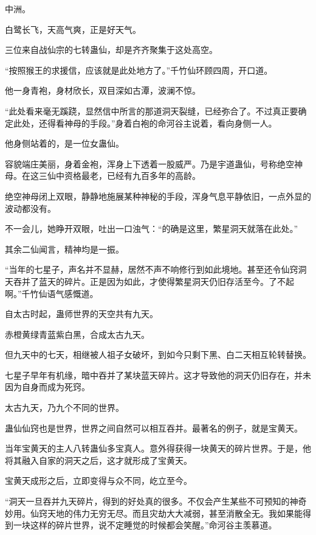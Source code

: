 
\begin{this_body}

中洲。

白鹭长飞，天高气爽，正是好天气。

三位来自战仙宗的七转蛊仙，却是齐齐聚集于这处高空。

“按照猴王的求援信，应该就是此处地方了。”千竹仙环顾四周，开口道。

他一身青袍，身材欣长，双目深如古潭，波澜不惊。

“此处看来毫无蹊跷，显然信中所言的那道洞天裂缝，已经弥合了。不过真正要确定此处，还得看神母的手段。”身着白袍的命河谷主说着，看向身侧一人。

他身侧站着的，是一位女蛊仙。

容貌端庄美丽，身着金袍，浑身上下透着一股威严。乃是宇道蛊仙，号称绝空神母。在这三仙中资格最老，已经有九百多年的高龄。

绝空神母闭上双眼，静静地施展某种神秘的手段，浑身气息平静依旧，一点外显的波动都没有。

不一会儿，她睁开双眼，吐出一口浊气：“的确是这里，繁星洞天就落在此处。”

其余二仙闻言，精神均是一振。

“当年的七星子，声名并不显赫，居然不声不响修行到如此境地。甚至还令仙窍洞天吞并了蓝天的碎片。正是因为如此，才使得繁星洞天仍旧存活至今。了不起啊。”千竹仙语气感慨道。

自太古时起，蛊师世界的天空共有九天。

赤橙黄绿青蓝紫白黑，合成太古九天。

但九天中的七天，相继被人祖子女破坏，到如今只剩下黑、白二天相互轮转替换。

七星子早年有机缘，暗中吞并了某块蓝天碎片。这才导致他的洞天仍旧存在，并未因为自身而成为死窍。

太古九天，乃九个不同的世界。

蛊仙仙窍也是世界，世界之间自然可以相互吞并。最著名的例子，就是宝黄天。

当年宝黄天的主人八转蛊仙多宝真人。意外得获得一块黄天的碎片世界。于是，他将其融入自家的洞天之后，这才就形成了宝黄天。

宝黄天成形之后，立即变得与众不同，屹立至今。

“洞天一旦吞并九天碎片，得到的好处真的很多。不仅会产生某些不可预知的神奇妙用。仙窍天地的伟力无穷无尽。而且灾劫大大减弱，甚至消散全无。我如果能得到一块这样的碎片世界，说不定睡觉的时候都会笑醒。”命河谷主羡慕道。


\end{this_body}
